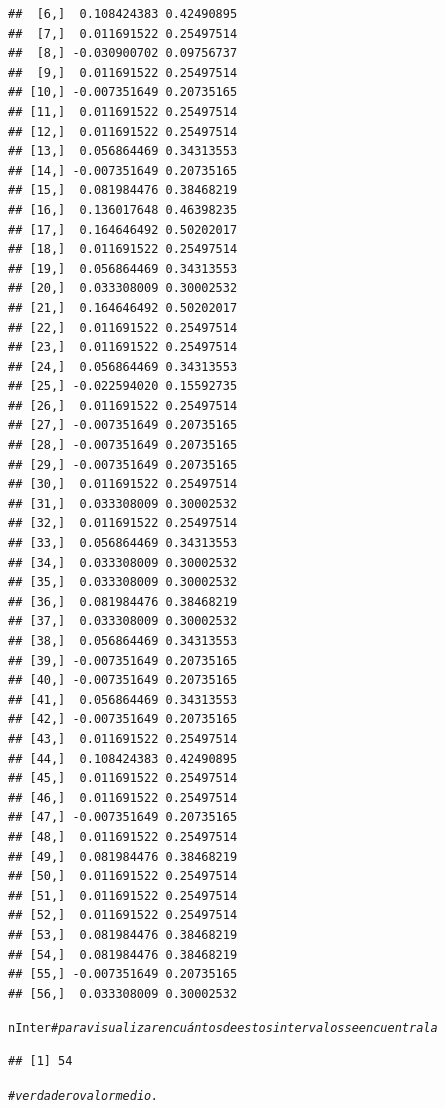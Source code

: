 \documentclass[12pt,letterpaper]{article}\usepackage[]{graphicx}\usepackage[]{color}
\makeatletter
\newcommand{\hlcom}[1]{\textcolor[rgb]{0.678,0.584,0.686}{\textit{#1}}}%
\newcommand{\hlstd}[1]{\textcolor[rgb]{0.345,0.345,0.345}{#1}}%
\newenvironment{kframe}{%
 \def\at@end@of@kframe{}%
 \ifinner\ifhmode%
  \def\at@end@of@kframe{\end{minipage}}%
  \begin{minipage}{\columnwidth}%
 \fi\fi%
 \def\FrameCommand##1{\hskip\@totalleftmargin \hskip-\fboxsep
 \colorbox{shadecolor}{##1}\hskip-\fboxsep
     \hskip-\linewidth \hskip-\@totalleftmargin \hskip\columnwidth}%
 \MakeFramed {\advance\hsize-\width
   \@totalleftmargin\z@ \linewidth\hsize
   \@setminipage}}%
 {\par\unskip\endMakeFramed%
 \at@end@of@kframe}
\newenvironment{knitrout}{}{} %
\makeatother
\begin{document}
\begin{knitrout}
\begin{kframe}
\begin{verbatim}
##  [6,]  0.108424383 0.42490895
##  [7,]  0.011691522 0.25497514
##  [8,] -0.030900702 0.09756737
##  [9,]  0.011691522 0.25497514
## [10,] -0.007351649 0.20735165
## [11,]  0.011691522 0.25497514
## [12,]  0.011691522 0.25497514
## [13,]  0.056864469 0.34313553
## [14,] -0.007351649 0.20735165
## [15,]  0.081984476 0.38468219
## [16,]  0.136017648 0.46398235
## [17,]  0.164646492 0.50202017
## [18,]  0.011691522 0.25497514
## [19,]  0.056864469 0.34313553
## [20,]  0.033308009 0.30002532
## [21,]  0.164646492 0.50202017
## [22,]  0.011691522 0.25497514
## [23,]  0.011691522 0.25497514
## [24,]  0.056864469 0.34313553
## [25,] -0.022594020 0.15592735
## [26,]  0.011691522 0.25497514
## [27,] -0.007351649 0.20735165
## [28,] -0.007351649 0.20735165
## [29,] -0.007351649 0.20735165
## [30,]  0.011691522 0.25497514
## [31,]  0.033308009 0.30002532
## [32,]  0.011691522 0.25497514
## [33,]  0.056864469 0.34313553
## [34,]  0.033308009 0.30002532
## [35,]  0.033308009 0.30002532
## [36,]  0.081984476 0.38468219
## [37,]  0.033308009 0.30002532
## [38,]  0.056864469 0.34313553
## [39,] -0.007351649 0.20735165
## [40,] -0.007351649 0.20735165
## [41,]  0.056864469 0.34313553
## [42,] -0.007351649 0.20735165
## [43,]  0.011691522 0.25497514
## [44,]  0.108424383 0.42490895
## [45,]  0.011691522 0.25497514
## [46,]  0.011691522 0.25497514
## [47,] -0.007351649 0.20735165
## [48,]  0.011691522 0.25497514
## [49,]  0.081984476 0.38468219
## [50,]  0.011691522 0.25497514
## [51,]  0.011691522 0.25497514
## [52,]  0.011691522 0.25497514
## [53,]  0.081984476 0.38468219
## [54,]  0.081984476 0.38468219
## [55,] -0.007351649 0.20735165
## [56,]  0.033308009 0.30002532
\end{verbatim}
\begin{alltt}
\hlstd{nInter} \hlcom{# para visualizar en cuántos de estos intervalos se encuentra la }
\end{alltt}
\begin{verbatim}
## [1] 54
\end{verbatim}
\begin{alltt}
\hlcom{# verdadero valor medio.}
\end{alltt}
\end{kframe}
\end{knitrout}
\end{document}
